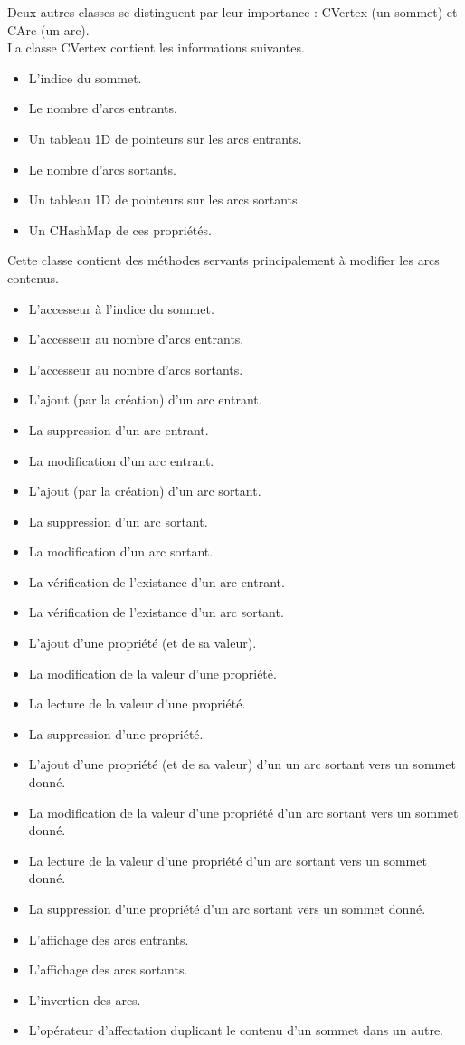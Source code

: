 		Deux autres classes se distinguent par leur importance : CVertex (un sommet) et CArc (un arc).\\
		
		La classe CVertex contient les informations suivantes.
		\begin{itemize}
			\item L'indice du sommet.
			\item Le nombre d'arcs entrants.
			\item Un tableau 1D de pointeurs sur les arcs entrants.
			\item Le nombre d'arcs sortants.
			\item Un tableau 1D de pointeurs sur les arcs sortants.
			\item Un CHashMap de ces propriétés.\\
		\end{itemize}
		Cette classe contient des méthodes servants principalement à modifier les arcs contenus.
		\begin{itemize}
			\item L'accesseur à l'indice du sommet.
			\item L'accesseur au nombre d'arcs entrants.
			\item L'accesseur au nombre d'arcs sortants.
			\item L'ajout (par la création) d'un arc entrant.
			\item La suppression d'un arc entrant.
			\item La modification d'un arc entrant.
			\item L'ajout (par la création) d'un arc sortant.
			\item La suppression d'un arc sortant.
			\item La modification d'un arc sortant.
			\item La vérification de l'existance d'un arc entrant.
			\item La vérification de l'existance d'un arc sortant.
			\item L'ajout d'une propriété (et de sa valeur).
			\item La modification de la valeur d'une propriété.
			\item La lecture de la valeur d'une propriété.
			\item La suppression d'une propriété.
			\item L'ajout d'une propriété (et de sa valeur) d'un un arc sortant vers un sommet donné.
			\item La modification de la valeur d'une propriété d'un arc sortant vers un sommet donné.
			\item La lecture de la valeur d'une propriété d'un arc sortant vers un sommet donné.
			\item La suppression d'une propriété d'un arc sortant vers un sommet donné.
			\item L'affichage des arcs entrants.
			\item L'affichage des arcs sortants.
			\item L'invertion des arcs.
			\item L'opérateur d'affectation duplicant le contenu d'un sommet dans un autre.\\
		\end{itemize}
		

